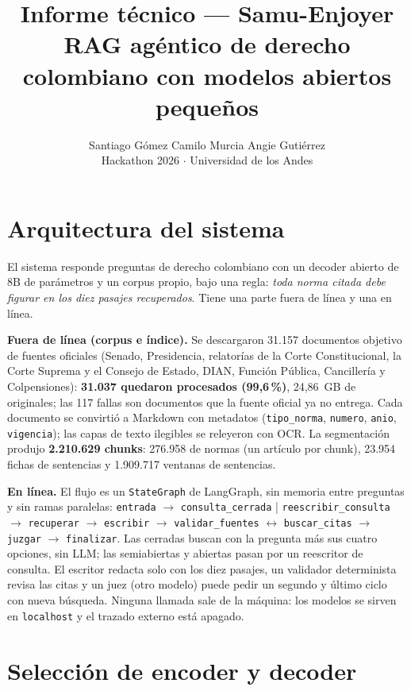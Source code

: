 \documentclass[10pt,twocolumn,letterpaper]{article}
\title{\vspace{-1.0cm}\Large\bfseries Informe técnico --- Samu-Enjoyer\\[3pt]
  \large\mdseries RAG agéntico de derecho colombiano con modelos abiertos pequeños}
\author{Santiago Gómez \quad Camilo Murcia \quad Angie Gutiérrez\\[2pt]
  \small Hackathon 2026 $\cdot$ Universidad de los Andes}
\date{}
\newcommand{\cod}[1]{\texttt{#1}}
\begin{document}
\maketitle
\vspace{-0.9cm}

\section{Arquitectura del sistema}

El sistema responde preguntas de derecho colombiano con un decoder abierto de 8B de
parámetros y un corpus propio, bajo una regla: \emph{toda norma citada debe figurar en
los diez pasajes recuperados}. Tiene una parte fuera de línea y una en línea.

\textbf{Fuera de línea (corpus e índice).} Se descargaron 31.157 documentos objetivo de
fuentes oficiales (Senado, Presidencia, relatorías de la Corte Constitucional, la Corte
Suprema y el Consejo de Estado, DIAN, Función Pública, Cancillería y Colpensiones):
\textbf{31.037 quedaron procesados (99,6\,\%)}, 24,86~GB de originales; las 117 fallas
son documentos que la fuente oficial ya no entrega. Cada documento se convirtió a Markdown
con metadatos (\cod{tipo\_norma}, \cod{numero}, \cod{anio}, \cod{vigencia}); las capas de
texto ilegibles se releyeron con OCR. La segmentación produjo \textbf{2.210.629 chunks}:
276.958 de normas (un artículo por chunk), 23.954 fichas de sentencias y 1.909.717
ventanas de sentencias.

\textbf{En línea.} El flujo es un \cod{StateGraph} de LangGraph, sin memoria entre
preguntas y sin ramas paralelas:
\cod{entrada} $\to$ \cod{consulta\_cerrada} | \cod{reescribir\_consulta} $\to$
\cod{recuperar} $\to$ \cod{escribir} $\to$ \cod{validar\_fuentes} $\leftrightarrow$
\cod{buscar\_citas} $\to$ \cod{juzgar} $\to$ \cod{finalizar}.
Las cerradas buscan con la pregunta más sus cuatro opciones, sin LLM; las semiabiertas
y abiertas pasan por un reescritor de consulta. El escritor redacta solo con los diez
pasajes, un validador determinista revisa las citas y un juez (otro modelo) puede pedir
un segundo y último ciclo con nueva búsqueda. Ninguna llamada sale de la máquina: los
modelos se sirven en \cod{localhost} y el trazado externo está apagado.

\section{Selección de encoder y decoder}
\end{document}
